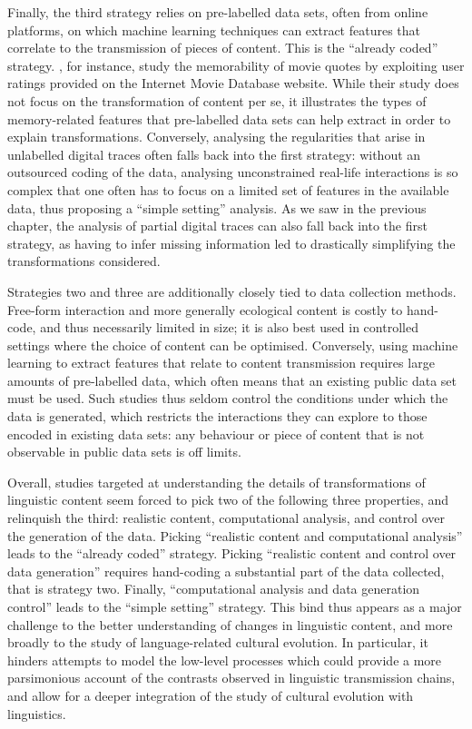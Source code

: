 Finally, the third strategy relies on pre-labelled data sets, often from
online platforms, on which machine learning techniques can extract
features that correlate to the transmission of pieces of content. This
is the \enquote{already coded} strategy.
\textcite{danescu-niculescu-mizil_you_2012}, for instance, study the
memorability of movie quotes by exploiting user ratings provided on the
Internet Movie Database website. While their study does not focus on the
transformation of content per se, it illustrates the types of
memory-related features that pre-labelled data sets can help extract in
order to explain transformations. Conversely, analysing the regularities
that arise in unlabelled digital traces often falls back into the first
strategy: without an outsourced coding of the data, analysing
unconstrained real-life interactions is so complex that one often has to
focus on a limited set of features in the available data, thus proposing
a \enquote{simple setting} analysis. As we saw in the previous chapter,
the analysis of partial digital traces can also fall back into the first
strategy, as having to infer missing information led to drastically
simplifying the transformations considered.

Strategies two and three are additionally closely tied to data
collection methods. Free-form interaction and more generally ecological
content is costly to hand-code, and thus necessarily limited in size; it
is also best used in controlled settings where the choice of content can
be optimised. Conversely, using machine learning to extract features
that relate to content transmission requires large amounts of
pre-labelled data, which often means that an existing public data set
must be used. Such studies thus seldom control the conditions under
which the data is generated, which restricts the interactions they can
explore to those encoded in existing data sets: any behaviour or piece
of content that is not observable in public data sets is off limits.

Overall, studies targeted at understanding the details of
transformations of linguistic content seem forced to pick two of the
following three properties, and relinquish the third: realistic content,
computational analysis, and control over the generation of the data.
Picking \enquote{realistic content and computational analysis} leads to
the \enquote{already coded} strategy. Picking \enquote{realistic content
and control over data generation} requires hand-coding a substantial
part of the data collected, that is strategy two. Finally,
\enquote{computational analysis and data generation control} leads to
the \enquote{simple setting} strategy. This bind thus appears as a major
challenge to the better understanding of changes in linguistic content,
and more broadly to the study of language-related cultural evolution. In
particular, it hinders attempts to model the low-level processes which
could provide a more parsimonious account of the contrasts observed in
linguistic transmission chains, and allow for a deeper integration of
the study of cultural evolution with linguistics.

